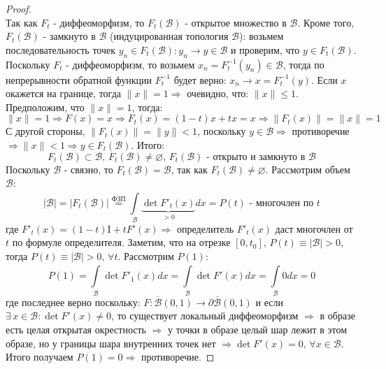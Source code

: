 \documentclass[12pt]{article}
\newcommand{\MI}{\mathrm{I}}
\newcommand{\MB}{\mathcal{B}}
\newcommand{\VN}{\varnothing}
\theoremstyle{definition}
\newcommand{\ddint}[2]{\displaystyle\int\limits_{#1}^{#2}}
\newcommand{\ovl}[1]{\overline{#1}}
\begin{document}
\begin{proof}
$$	 $$
	 Так как $F_t$ - диффеоморфизм, то $F_t(\MB)$ - открытое множество в $\MB$. Кроме того, $F_t(\MB)$ - замкнуто в $\MB$ (индуцированная топология $\MB$): возьмем последовательность точек $y_n \in F_t(\MB) \colon y_n \to y \in \MB$ и проверим, что $y \in F_t(\MB)$. Поскольку $F_t$ - диффеоморфизм, то возьмем $x_n = F_t^{-1}(y_n) \in \MB$, тогда по непрерывности обратной функции $F_t^{-1}$ будет верно: $x_n \to x = F_t^{-1}(y)$. Если $x$ окажется на границе, тогда $\|x\| = 1 \Rightarrow$ очевидно, что: $\|x\| \leq 1$. Предположим, что $\|x\| = 1$, тогда:
	 $$
	 	\|x \| = 1 \Rightarrow F(x) = x \Rightarrow F_t(x) = (1 - t)x + tx = x \Rightarrow \|F_t(x)\| = \|x\| = 1
	 $$
	 С другой стороны, $\|F_t(x)\| =\|y\| < 1$, поскольку $y \in \MB \Rightarrow$ противоречие $\Rightarrow \|x\| < 1 \Rightarrow y \in F_t(\MB)$. Итого:
	 $$
	 	F_t(\MB) \subset \MB, \, F_t(\MB) \neq \VN, \, F_t(\MB) \text{ - открыто и замкнуто в } \MB
	 $$
	 Поскольку $\MB$ - связно, то $F_t(\MB) = \MB$, так как $F_t(\MB) \neq \VN$. Рассмотрим объем $\MB$:
	 $$
	 	|\MB| = |F_t(\MB)| \overset{\text{ФЗП}}{=} \ddint{\MB}{}\underbrace{\det{F'_t(x)}}_{ > 0}dx = P(t) \text{ - многочлен по }t
	 $$
	 где $F'_t(x) = (1 - t)\MI + tF'(x) \Rightarrow$ определитель $F'_t(x)$ даст многочлен от $t$ по формуле определителя. Заметим, что на отрезке $[0,t_0], \, P(t) \equiv |\MB| > 0$, тогда $P(t) \equiv |\MB| > 0, \, \forall t$. Рассмотрим $P(1)$:
	 $$
	 	P(1) = \ddint{\MB}{}\det{F'_1(x)}dx = \ddint{\MB}{}\det{F'(x)}dx = \ddint{\MB}{}0dx = 0 
	 $$
	 где последнее верно поскольку: $F\colon \ovl{\MB}(0,1) \to \partial \ovl{\MB}(0,1)$ и если $\exists \, x \in \MB \colon \det{F'(x)} \neq 0$, то существует локальный диффеоморфизм $\Rightarrow$ в образе есть целая открытая окрестность $\Rightarrow$ у точки в образе целый шар лежит в этом образе, но у границы шара внутренних точек нет $\Rightarrow \det{F'(x) } = 0, \, \forall x \in \MB$. Итого получаем $P(1) = 0 \Rightarrow$ противоречие.
	 

\end{proof}
\end{document}
